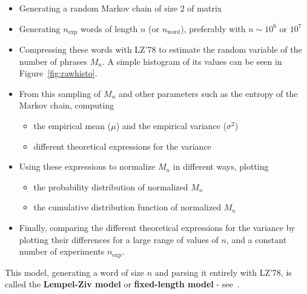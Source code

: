 \begin{itemize}[nosep]
	\item Generating a random Markov chain of size 2 of matrix

	\item Generating $n_{\text{exp}}$ words of length 
	$n $ (or $n_{\text{word}}$), preferably with $n \sim 10^6 \text{ or } 10^7$
	
	\item Compressing these words with LZ'78 to estimate the random variable of
	the number of phrases $M_n$. A simple histogram of its values
	can be seen in Figure~\ref{fig:rawhisto}.
	
	\item From this sampling of  $M_n$ and other parameters such as the entropy
	of the Markov chain, computing
 
		\begin{itemize}[nosep]
			\item the empirical mean ($\mu$) and the empirical variance ($\sigma^2$)
			\item different theoretical expressions for the variance
		\end{itemize}
 	
	\item Using these expressions to normalize $M_n$ in different ways, plotting
	
		\begin{itemize}[nosep]
			\item the probability distribution of normalized $M_n$ 
				
			\item the cumulative distribution function of normalized $M_n$
		\end{itemize}
 
	\item Finally, comparing the different theoretical expressions for the variance 
	by plotting their differences for a large range of values of $n$, and
	a constant number of experiments $n_{\text{exp}}$.
\end{itemize}

\begin{rmk}
	This model, generating a word of size $n$ and parsing it 
	entirely with LZ'78, is called the {\bfseries Lempel-Ziv model} 
	or {\bfseries fixed-length model} - see~\cite{jacquet_average_2001}.
\end{rmk}

